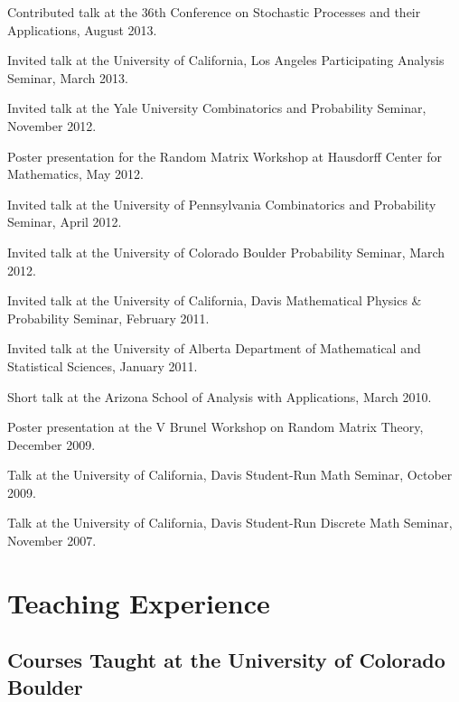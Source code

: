 \documentclass[letterpaper]{article}
\renewenvironment{itemize}{
  \begin{list}{}{
    \setlength{\leftmargin}{1em}
  }
}{
  \end{list}
}
\begin{document}
\begin{itemize}
	\item Contributed talk at the $36$th Conference on Stochastic Processes and their Applications, August 2013.
	\item Invited talk at the University of California, Los Angeles Participating Analysis Seminar, March 2013.  
	\item Invited talk at the Yale University Combinatorics and Probability Seminar, November 2012.  
	\item Poster presentation for the Random Matrix Workshop at Hausdorff Center for Mathematics, May 2012.
	\item Invited talk at the University of Pennsylvania Combinatorics and Probability Seminar, April 2012.
	\item Invited talk at the University of Colorado Boulder Probability Seminar, March 2012.
	\item Invited talk at the University of California, Davis Mathematical Physics \& Probability Seminar, February 2011.  
	\item Invited talk at the University of Alberta Department of Mathematical and Statistical Sciences, January 2011.  
	\item Short talk at the Arizona School of Analysis with Applications, March 2010.
	\item Poster presentation at the V Brunel Workshop on Random Matrix Theory, December 2009.
	\item Talk at the University of California, Davis Student-Run Math Seminar, October 2009.
	\item Talk at the University of California, Davis Student-Run Discrete Math Seminar, November 2007.
\end{itemize}
 


\section*{Teaching Experience}
\subsection*{Courses Taught at the University of Colorado Boulder}
\end{document}
